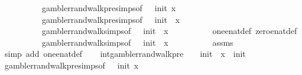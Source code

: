 \begin{isabellebody}
\ \ \ \ \ \ \ \ \ \ gambler{\isacharunderscore}{\kern0pt}rand{\isacharunderscore}{\kern0pt}walk{\isacharunderscore}{\kern0pt}pre{\isachardot}{\kern0pt}simps{\isacharparenleft}{\kern0pt}{}{\isacharparenright}{\kern0pt}{\isacharbrackleft}{\kern0pt}of\ {}\ {\isachardoublequoteopen}{\isacharminus}{\kern0pt}{}{\isachardoublequoteclose}\ init\ x{\isacharbrackright}{\kern0pt}\isanewline
\ \ \ \ \ \ \ \ \ \ gambler{\isacharunderscore}{\kern0pt}rand{\isacharunderscore}{\kern0pt}walk{\isacharunderscore}{\kern0pt}pre{\isachardot}{\kern0pt}simps{\isacharparenleft}{\kern0pt}{}{\isacharparenright}{\kern0pt}{\isacharbrackleft}{\kern0pt}of\ {}\ {\isachardoublequoteopen}{\isacharminus}{\kern0pt}{}{\isachardoublequoteclose}\ init\ {}\ x{\isacharbrackright}{\kern0pt}\isanewline
\ \ \ \ \ \ \ \ \ \ gambler{\isacharunderscore}{\kern0pt}rand{\isacharunderscore}{\kern0pt}walk{\isachardot}{\kern0pt}simps{\isacharbrackleft}{\kern0pt}of\ {}\ {\isachardoublequoteopen}{\isacharminus}{\kern0pt}{}{\isachardoublequoteclose}\ init\ {}\ x{\isacharbrackright}{\kern0pt}\isanewline
\ \ \ \ \ \ \ \ \ \ one{\isacharunderscore}{\kern0pt}enat{\isacharunderscore}{\kern0pt}def\ zero{\isacharunderscore}{\kern0pt}enat{\isacharunderscore}{\kern0pt}def\isanewline
\ \ \ \ \ \ \ \ \ \ gambler{\isacharunderscore}{\kern0pt}rand{\isacharunderscore}{\kern0pt}walk{\isachardot}{\kern0pt}simps{\isacharbrackleft}{\kern0pt}of\ {}\ {\isachardoublequoteopen}{\isacharminus}{\kern0pt}{}{\isachardoublequoteclose}\ init\ {}\ x{\isacharbrackright}{\kern0pt}\isanewline
\ \ \ \ \ \ \ \ \ \ assms\isanewline
\ \ \ \ \isamarkupfalse%
\ {\isacharparenleft}{\kern0pt}simp\ add{\isacharcolon}{\kern0pt}\ one{\isacharunderscore}{\kern0pt}enat{\isacharunderscore}{\kern0pt}def{\isacharparenright}{\kern0pt}\isanewline
\ \ \isamarkupfalse%
\ int{}{\isacharcolon}{\kern0pt}{\isachardoublequoteopen}gambler{\isacharunderscore}{\kern0pt}rand{\isacharunderscore}{\kern0pt}walk{\isacharunderscore}{\kern0pt}pre\ {}\ {\isacharparenleft}{\kern0pt}{\isacharminus}{\kern0pt}\ {}{\isacharparenright}{\kern0pt}\ init\ {}\ x\ {\isacharequal}{\kern0pt}\ init{\isachardoublequoteclose}\isanewline
\ \ \ \ \isamarkupfalse%
\ gambler{\isacharunderscore}{\kern0pt}rand{\isacharunderscore}{\kern0pt}walk{\isacharunderscore}{\kern0pt}pre{\isachardot}{\kern0pt}simps{\isacharparenleft}{\kern0pt}{}{\isacharparenright}{\kern0pt}{\isacharbrackleft}{\kern0pt}of\ {}\ {\isachardoublequoteopen}{\isacharminus}{\kern0pt}{}{\isachardoublequoteclose}\ init\ x{\isacharbrackright}{\kern0pt}\isanewline

\end{isabellebody}
